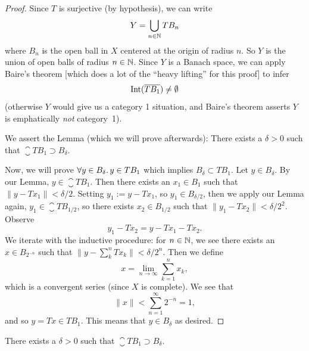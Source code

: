 \begin{proof}
Since $T$ is surjective (by hypothesis), we can write
\begin{equation}
Y = \bigcup_{n\in\mathbb{N}}TB_{n}
\end{equation}
where $B_{n}$ is the open ball in $X$ centered at the origin of radius $n$.
So $Y$ is the union of open balls of radius $n\in\mathbb{N}$. Since $Y$ is a
Banach space, we can apply Baire's theorem [which does a lot of the
``heavy lifting'' for this proof] to infer
\begin{equation}\label{eq:fall-lec12:math110a:open-mapping-theorem:eq1}
\operatorname{Int}(\overline{TB_{1}})\neq\emptyset
\end{equation}
(otherwise $Y$ would give us a category 1 situation, and Baire's
theorem asserts $Y$ is emphatically \emph{not} category~1).

We assert the Lemma (which we will prove afterwards): There exists a
$\delta>0$ such that $\closure{TB_{1}}\supset B_{\delta}$.

Now, we will prove $\forall y\in B_{\delta}\ldotp y\in TB_{1}$ which
implies $B_{\delta}\subset TB_{1}$. Let $y\in B_{\delta}$.
By our Lemma, $y\in\closure{TB_{1}}$. Then there exists an $x_{1}\in B_{1}$
such that $\|y-Tx_{1}\|<\delta/2$. Setting $y_{1}:=y-Tx_{1}$, so
$y_{1}\in B_{\delta/2}$, then we apply our Lemma again,
$y_{1}\in\closure{TB_{1/2}}$, so there exists $x_{2}\in B_{1/2}$ such
that $\|y_{1}-Tx_{2}\|<\delta/2^{2}$. Observe
\begin{equation}
y_{1}-Tx_{2}=y-Tx_{1}-Tx_{2}.
\end{equation}
We iterate with the inductive procedure: for $n\in\mathbb{N}$, we see there
exists an $x\in B_{2^{-n}}$ such that $\|y-\sum^{n}_{k}Tx_{k}\|<\delta/2^{n}$.
Then we define
\begin{equation}
x=\lim_{n\to\infty}\sum^{n}_{k=1}x_{k},
\end{equation}
which is a convergent series (since $X$ is complete). We see that
\begin{equation}
\|x\|<\sum^{\infty}_{n=1}2^{-n}=1,
\end{equation}
and so $y=Tx\in TB_{1}$. This means that $y\in B_{\delta}$ as desired.
\end{proof}

\begin{lemma}
There exists a $\delta>0$ such that $\closure{TB_{1}}\supset B_{\delta}$.
\end{lemma}

